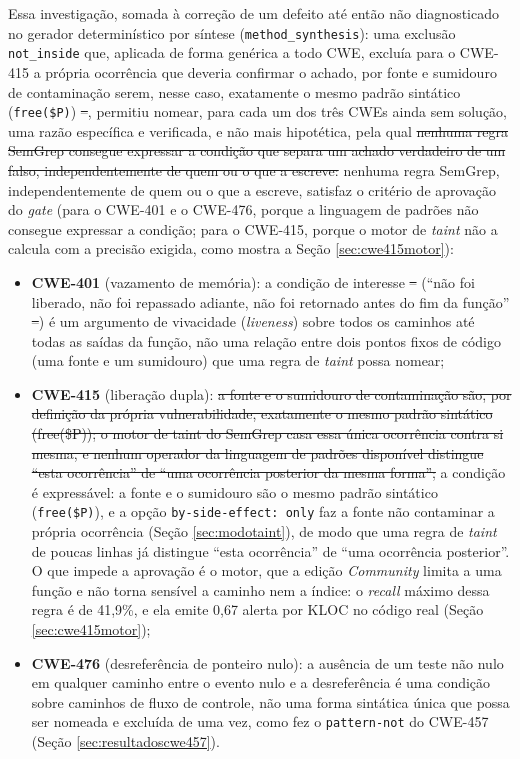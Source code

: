 \documentclass[
    12pt,                %
    openright,           %
    oneside,             %
    a4paper,             %
    english,             %
    brazil               %
]{abntex2}
\newcommand{\antigo}[1]{\sout{#1}}
\newcommand{\novo}[1]{{\color{red}#1}}
\begin{document}
\par
Essa investigação, somada à correção de um defeito até então não diagnosticado no gerador determinístico por síntese (\texttt{method\_synthesis}): uma exclusão \texttt{not\_inside} que, aplicada de forma genérica a todo CWE, excluía para o CWE-415 a própria ocorrência que deveria confirmar o achado, por fonte e sumidouro de contaminação serem, nesse caso, exatamente o mesmo padrão sintático (\texttt{free(\$P)})\antigo{ --}\novo{,} permitiu nomear, para cada um dos três CWEs ainda sem solução, uma razão específica e verificada, e não mais hipotética, pela qual \antigo{nenhuma regra SemGrep consegue expressar a condição que separa um achado verdadeiro de um falso, independentemente de quem ou o que a escreve:} \novo{nenhuma regra SemGrep, independentemente de quem ou o que a escreve, satisfaz o critério de aprovação do \textit{gate} (para o CWE-401 e o CWE-476, porque a linguagem de padrões não consegue expressar a condição; para o CWE-415, porque o motor de \textit{taint} não a calcula com a precisão exigida, como mostra a Seção \ref{sec:cwe415motor}):}
\begin{itemize}
  \item \textbf{CWE-401} (vazamento de memória): a condição de interesse\antigo{ --}\novo{ (}``não foi liberado, não foi repassado adiante, não foi retornado antes do fim da função''\antigo{ --}\novo{)} é um argumento de vivacidade (\textit{liveness}) sobre todos os caminhos até todas as saídas da função, não uma relação entre dois pontos fixos de código (uma fonte e um sumidouro) que uma regra de \textit{taint} possa nomear;
  \item \textbf{CWE-415} (liberação dupla): \antigo{a fonte e o sumidouro de contaminação são, por definição da própria vulnerabilidade, exatamente o mesmo padrão sintático (free(\$P)); o motor de taint do SemGrep casa essa única ocorrência contra si mesma, e nenhum operador da linguagem de padrões disponível distingue ``esta ocorrência'' de ``uma ocorrência posterior da mesma forma'';} \novo{a condição é expressável: a fonte e o sumidouro são o mesmo padrão sintático (\texttt{free(\$P)}), e a opção \texttt{by-side-effect: only} faz a fonte não contaminar a própria ocorrência (Seção \ref{sec:modotaint}), de modo que uma regra de \textit{taint} de poucas linhas já distingue ``esta ocorrência'' de ``uma ocorrência posterior''. O que impede a aprovação é o motor, que a edição \textit{Community} limita a uma função e não torna sensível a caminho nem a índice: o \textit{recall} máximo dessa regra é de 41,9\%, e ela emite 0,67 alerta por KLOC no código real (Seção \ref{sec:cwe415motor});}
  \item \textbf{CWE-476} (desreferência de ponteiro nulo): a ausência de um teste não nulo em qualquer caminho entre o evento nulo e a desreferência é uma condição sobre caminhos de fluxo de controle, não uma forma sintática única que possa ser nomeada e excluída de uma vez, como fez o \texttt{pattern-not} do CWE-457 (Seção \ref{sec:resultadoscwe457}).
\end{itemize}
\end{document}
